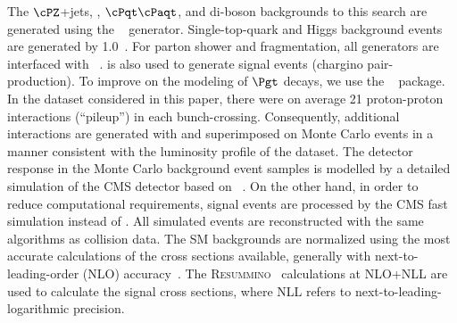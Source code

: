 The $\cPZ$+jets, \wjets, $\cPqt\cPaqt$, and di-boson backgrounds to this search  are generated using the ~\cite{Alwall:2011uj} generator.
Single-top-quark and Higgs background events are generated by {\POWHEG} 1.0~\cite{Nason:2004rx,Frixione:2007vw,Alioli:2009je,Alioli:2010xd}.
For parton shower and fragmentation, all generators are interfaced with ~\cite{Sjostrand:2006za}.
\PYTHIA is also used to generate signal events (chargino pair-production). To improve on the modeling of $\Pgt$ decays, we use the  \TAUOLA~\cite{Davidson:2010rw} package.
In the dataset considered in this paper,
there were on average 21 proton-proton interactions (``pileup'') in each bunch-crossing.
Consequently, additional interactions are generated with \PYTHIA and superimposed on Monte Carlo events in a manner consistent with the
luminosity profile of the dataset.
The detector response in the Monte Carlo background event samples is modelled by a
detailed simulation
of the CMS detector based on {\GEANTfour}~\cite{Agostinelli:2002hh}.  On the other hand, in order to reduce  computational requirements, signal events 
are processed by the CMS fast simulation \cite{Abdullin:2011zz} instead of {\GEANTfour}. 
All simulated events are reconstructed with the same algorithms as collision data.
The SM backgrounds are normalized using the most accurate calculations of the cross sections available,
generally with next-to-leading-order (NLO)
accuracy~\cite{Campbell:2012uf,Campbell:2011bn,xsec_WZ}.
The \textsc{Resummino}~\cite{Fuks:2012qx,Fuks:2013vua,Fuks:2013lya} calculations at NLO+NLL are used to calculate the signal cross sections, where 
NLL refers to next-to-leading-logarithmic precision.





